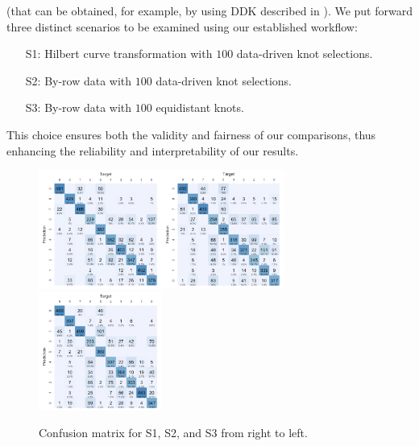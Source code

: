  (that can be obtained, for example, by using DDK described in  \cite{basna2022data}). 
We put forward three distinct scenarios to be examined using our established workflow:
\begin{itemize}
    \item [S1:] Hilbert curve transformation with $100$ data-driven knot selections.
    \item [S2:] By-row data with $100$ data-driven knot selections.
    \item [S3:] By-row data with $100$ equidistant knots.
\end{itemize}
This choice ensures both the validity and fairness of our comparisons, thus enhancing the reliability and interpretability of our results. 

\begin{figure}[t!]
  \centering
\hspace*{-.8cm}\includegraphics[width=0.36\textwidth]{figures/Fig10LeftConfMat.png}\includegraphics[width=0.36\textwidth]{figures/Fig10MiddleConfMat.png}\includegraphics[width=0.36\textwidth]{figures/Fig10RightConfMat.png}
  \caption{Confusion matrix for S1, S2, and S3 from right to left.}\vspace{-.22cm}
  \label{CM}
  \end{figure}

